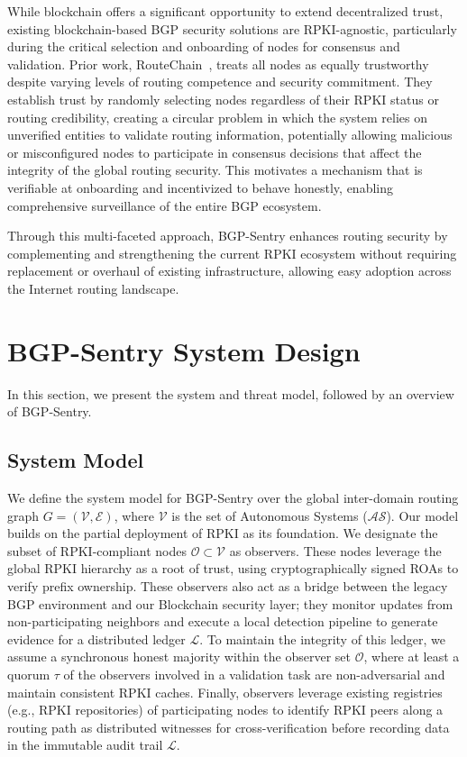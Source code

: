 \documentclass[conference]{IEEEtran}
\newcommand{\BfPara}[1]{\vspace{1mm}{\noindent\textbf{#1.}}\xspace}
\newcommand{\md}[1]{{\color{purple}#1}}
\begin{document}
\BfPara{Rootless Identity and Event Integrity} 
\md{While blockchain offers a significant opportunity to extend decentralized trust, existing blockchain-based BGP security solutions are RPKI-agnostic, particularly during the critical selection and onboarding of nodes for consensus and validation. Prior work, RouteChain~\cite{saad2022routechain}, treats all nodes as equally trustworthy despite varying levels of routing competence and security commitment. They establish trust by randomly selecting nodes regardless of their RPKI status or routing credibility, creating a circular problem in which the system relies on unverified entities to validate routing information, potentially allowing malicious or misconfigured nodes to participate in consensus decisions that affect the integrity of the global routing security. 
This motivates a mechanism that is verifiable at onboarding and incentivized to behave honestly, enabling comprehensive surveillance of the entire BGP ecosystem.}


Through this multi-faceted approach, BGP-Sentry enhances routing security by complementing and strengthening the current RPKI ecosystem without requiring replacement or overhaul of existing infrastructure, allowing easy adoption across the Internet routing landscape.






\section{BGP-Sentry System Design}
\label{sec:system_threat_model}
In this section, we present the system and threat model, followed by an overview of BGP-Sentry.


\subsection{System Model}
\label{subsec:system_model}

\md{We define the system model for BGP-Sentry over the global inter-domain routing graph $G = (\mathcal{V}, \mathcal{E})$, where $\mathcal{V}$ is the set of Autonomous Systems ($\mathcal{AS}$). Our model builds on the partial deployment of RPKI as its foundation. We designate the subset of RPKI-compliant nodes $\mathcal{O} \subset \mathcal{V}$ as observers. These nodes leverage the global RPKI hierarchy as a root of trust, using cryptographically signed ROAs to verify prefix ownership. These observers also act as a bridge between the legacy BGP environment and our Blockchain security layer; they monitor updates from non-participating neighbors and execute a local detection pipeline to generate evidence for a distributed ledger $\mathcal{L}$. To maintain the integrity of this ledger, we assume a synchronous honest majority within the observer set $\mathcal{O}$, where at least a quorum $\tau$ of the observers involved in a validation task are non-adversarial and maintain consistent RPKI caches. 
Finally, observers leverage existing registries (e.g., RPKI repositories) of participating nodes to identify RPKI peers along a routing path as distributed witnesses for cross-verification before recording data in the immutable audit trail $\mathcal{L}$.}
\end{document}
